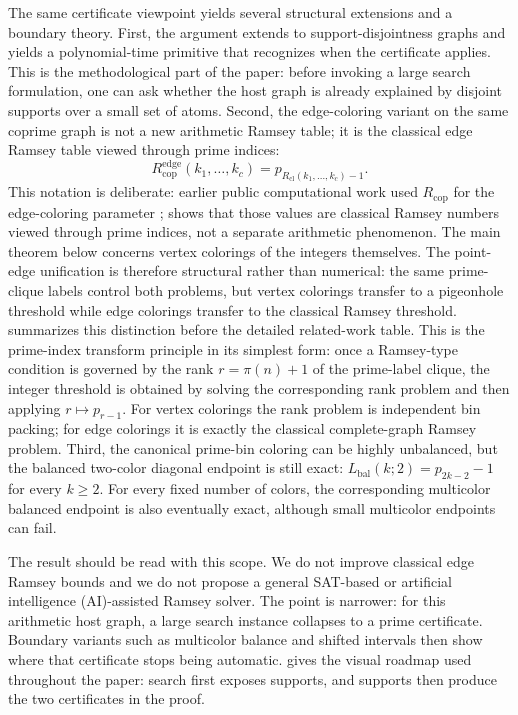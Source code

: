 \documentclass[11pt]{article}
\theoremstyle{plain}
\theoremstyle{definition}
\theoremstyle{remark}
\newcommand{\Redge}{R_{\mathrm{cop}}^{\mathrm{edge}}}
\newcommand{\Rcl}{R_{\mathrm{cl}}}
\begin{document}
The same certificate viewpoint yields several structural extensions and a
boundary theory.  First, the argument extends to support-disjointness graphs
and yields a polynomial-time primitive that recognizes when the certificate
applies.  This is the methodological part of the paper: before invoking a
large search formulation, one can ask whether the host graph is already
explained by disjoint supports over a small set of atoms.  Second, the
edge-coloring variant on the same coprime graph is
not a new arithmetic Ramsey table; it is the classical edge Ramsey table
viewed through prime indices:
\[
  \Redge(k_1,\ldots,k_c)=p_{\Rcl(k_1,\ldots,k_c)-1}.
\]
This notation is deliberate: earlier public computational work used
$R_{\mathrm{cop}}$ for the edge-coloring parameter
\cite{towell-blog,towell-github};  shows that those
values are classical Ramsey numbers viewed through prime indices, not a
separate arithmetic phenomenon.  The main theorem below concerns vertex
colorings of the integers themselves.
The point-edge unification is therefore structural rather than numerical:
the same prime-clique labels control both problems, but vertex colorings
transfer to a pigeonhole threshold while edge colorings transfer to the
classical Ramsey threshold.
 summarizes this distinction before the
detailed related-work table.
This is the prime-index transform principle in its simplest form: once a
Ramsey-type condition is governed by the rank $r=\pi(n)+1$ of the prime-label
clique, the integer threshold is obtained by solving the corresponding rank
problem and then applying $r\mapsto p_{r-1}$.  For vertex colorings the rank
problem is independent bin packing; for edge colorings it is exactly the
classical complete-graph Ramsey problem.
Third, the canonical prime-bin coloring can be highly unbalanced, but the
balanced two-color diagonal endpoint is still exact:
$L_{\mathrm{bal}}(k;2)=p_{2k-2}-1$ for every $k\ge2$.  For every fixed number
of colors, the corresponding multicolor balanced endpoint is also eventually
exact, although small multicolor endpoints can fail.

The result should be read with this scope.  We do not improve classical edge
Ramsey bounds and we do not propose a general SAT-based or artificial
intelligence (AI)-assisted Ramsey solver.  The point is narrower: for this
arithmetic host graph, a large search instance collapses to a prime
certificate.  Boundary
variants such as multicolor balance and shifted intervals then show where
that certificate stops being automatic.
 gives the visual roadmap used throughout
the paper: search first exposes supports, and supports then produce the two
certificates in the proof.
\end{document}
